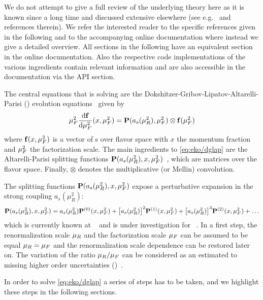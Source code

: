 
We do not attempt to give a full review of the underlying theory
here as it is known since a long time and discussed extensive elsewhere
(see e.g.\ \cite{Peskin:1995ev,Ellis:1996mzs} and references therein).
We refer the interested reader to the specific references given in the following and to
the accompanying online documentation where instead we give a detailed
overview. All sections in the following have an equivalent section in
the online documentation. Also the respective code implementations of the
various ingredients contain relevant information and are also accessible
in the documentation via the API section.

The central equations that \eko{} is solving are the
Dokshitzer-Gribov-Lipatov-Altarelli-Parisi (\dglap) evolution
equations~\cite{Altarelli:1977zs,Gribov:1972ri,Dokshitzer:1977sg} given by
\begin{equation}
	\muF^2 \dv{\vb f}{\muF^2}{}(x,\muF^2) = \vb P (a_s(\muR^2),\muF^2) \otimes \vb f(\muF^2)
	\label{eq:eko/dglap}
\end{equation}
where $\vb f(x,\mu_F^2)$ is a vector of \pdf{}s over flavor space with $x$ the
momentum fraction and $\mu_F^2$ the factorization scale.
The main ingredients to \cref{eq:eko/dglap} are the Altarelli-Parisi splitting
functions $\vb P(a_s(\mu_R^2),x,\mu_F^2)$~\cite{Moch:2004pa,Vogt:2004mw}, which
are matrices over the flavor space.
Finally, $\otimes$ denotes the multiplicative (or Mellin) convolution.

The splitting functions $\vb P(a_s(\mu_R^2),x,\mu_F^2)$ expose a perturbative
expansion in the strong coupling $a_s(\mu_R^2)$:
\begin{align}
	\vb P(a_s(\mu_R^2),x,\mu_F^2) = a_s(\mu_R^2) \vb P^{(0)}(x,\mu_F^2)
	+ \qty[a_s(\mu_R^2)]^2 \vb P^{(1)}(x,\mu_F^2)
	+ \qty[a_s(\mu_R^2)]^3 \vb P^{(2)}(x,\mu_F^2)
	+ \ldots
\end{align}
which is currently known at \nnlo{}~\cite{Moch:2004pa,Vogt:2004mw,Blumlein:2021enk} and is under
investigation for \nnnlo{}~\cite{Moch:2021qrk}.
In a first step, the renormalization scale $\mu_R$ and the factorization scale
$\mu_F$ can be assumed to be equal $\mu_R = \mu_F$ and the renormalization scale
dependence can be restored later on. The variation of the ratio $\mu_R/\mu_F$ can
be considered as an estimated to missing higher order
uncertainties (\mhou{})~\cite{AbdulKhalek:2019ihb}.

In order to solve \cref{eq:eko/dglap} a series of steps has to be taken, and we
highlight these steps in the following sections.

